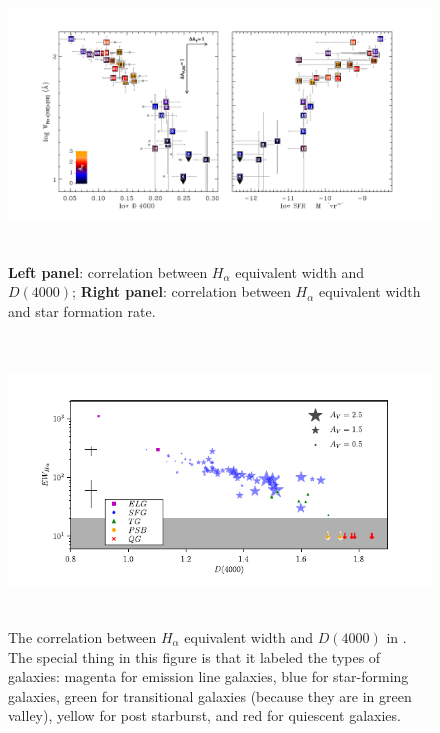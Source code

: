 \documentclass{ar-1col}
\begin{document}
\begin{figure}
    \includegraphics[width=6in, height=3in]{images/correlation_Ha_D4000.pdf}
    \caption{\textbf{Left panel}: correlation between $H_\alpha$ equivalent width and $D(4000)$; \textbf{Right panel}: correlation between $H_\alpha$ equivalent width and star formation rate.}
    \label{fig:correlation_kreik}
\end{figure}

\begin{figure}
    \includegraphics[width=6in, height=3in]{images/Forrest_Ha_D4000.pdf}
    \caption{The correlation between $H_\alpha$ equivalent width and $D(4000)$ in \citet{Forrest2018}. The special thing in this figure is that it labeled the types of galaxies: magenta for emission line galaxies, blue for star-forming galaxies, green for transitional galaxies (because they are in green valley), yellow for post starburst, and red for quiescent galaxies. }
    \label{fig:correlation}
\end{figure}
\end{document}

